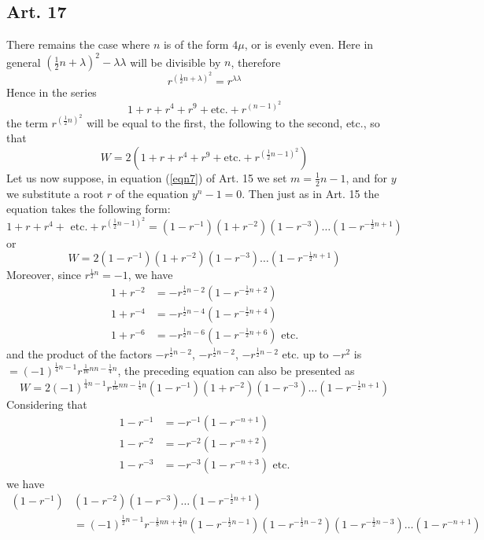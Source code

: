 \documentclass{book}
\theoremstyle{plain}
\theoremstyle{remark}
\begin{document}
\subsection*{Art. 17} 
There remains the case where $n$ is of the form $4\mu$, or is evenly even.  Here in general $(\tfrac{1}{2}n+\lambda)^2 - \lambda\lambda$ will be divisible by $n$, therefore
\[ r^{(\frac{1}{2}n+\lambda)^2} = r^{\lambda\lambda} \]
Hence in the series
\[ 1 + r + r^4 + r^9 + \textrm{etc.} + r^{(n-1)^2} \]
the term $r^{(\frac{1}{2} n)^2}$ will be equal to the first, the following to the second, etc., so that 
\[ W = 2(1 + r + r^4 + r^9 + \textrm{etc.} + r^{(\frac{1}{2}n-1)^2} ) \]
Let us now suppose, in equation (\ref{eqn7}) of Art. 15 we set $m = \frac{1}{2}n-1$, and for $y$ we substitute a root $r$ of the equation $y^n-1=0$.  Then just as in Art. 15 the equation takes the following form:
\[ 1 + r + r^4 + \textrm{ etc}. + r^{(\frac{1}{2}n - 1)^2} = (1-r^{-1})(1+r^{-2})(1-r^{-3})\dots (1-r^{-\frac{1}{2} n + 1}) \]
or 
\begin{equation} W = 2(1-r^{-1})(1+r^{-2})(1-r^{-3})\dots (1-r^{-\frac{1}{2} n + 1}) \label{eqn8} \end{equation}
Moreover, since $r^{\frac{1}{2} n} = -1$, we have
\begin{align*} 
1 + r^{-2} &= -r^{\frac{1}{2}n - 2} (1-r^{-\frac{1}{2} n + 2}) \\
1 + r^{-4} &= -r^{\frac{1}{2}n - 4} (1-r^{-\frac{1}{2} n + 4}) \\
1 + r^{-6} &= -r^{\frac{1}{2}n - 6} (1-r^{-\frac{1}{2} n + 6}) \textrm{ etc.}
\end{align*}
and the product of the factors $-r^{\frac{1}{2}n - 2}$, $-r^{\frac{1}{2}n - 2}$, $-r^{\frac{1}{2}n - 2}$ etc. up to $-r^2$ is $= (-1)^{\frac{1}{4}n-1} r^{\frac{1}{16}nn- \frac{1}{4}n}$, the preceding equation can also be presented as
\[ W = 2 (-1)^{\frac{1}{4}n-1} r^{\frac{1}{16}nn - \frac{1}{4} n} (1-r^{-1})(1+r^{-2})(1-r^{-3})\dots (1-r^{-\frac{1}{2} n + 1}) \]
Considering that 
\begin{align*}  
1-r^{-1} &= -r^{-1} (1-r^{-n+1}) \\
1-r^{-2} &= -r^{-2} (1-r^{-n+2}) \\
1-r^{-3} &= -r^{-3} (1-r^{-n+3}) \textrm{ etc.}
\end{align*} 
we have
\begin{align*} (1-r^{-1})&(1-r^{-2})(1-r^{-3})\dots(1-r^{-\frac{1}{2}n+1}) \\
&= (-1)^{\frac{1}{2} n - 1} r^{-\frac{1}{8} nn + \frac{1}{4} n} (1-r^{-\frac{1}{2}n-1})(1-r^{-\frac{1}{2}n-2})(1-r^{-\frac{1}{2}n-3})\dots(1-r^{-n+1}) \end{align*} 
\end{document}
